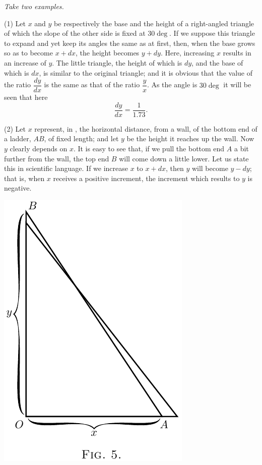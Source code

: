 \documentclass{ximera}
\begin{document}
\textit{Take two examples.}

(1) Let $x$ and $y$ be respectively the base and the
height of a right-angled triangle 
of which the slope of the other side is fixed at $30 \deg$. If we
suppose this triangle to expand and yet keep its
angles the same as at first, then, when the base grows
so as to become $x + dx$, the height becomes $y + dy$.
Here, increasing $x$ results in an increase of $y$. The
little triangle, the height of which is $dy$, and the base
of which is $dx$, is similar to the original triangle; and
it is obvious that the value of the ratio $\dfrac{dy}{dx}$ is the
same as that of the ratio $\dfrac{y}{x}$. As the angle is $30\deg$ it
will be seen that here
$$
\frac{dy}{dx} = \frac{1}{1.73}.
$$

(2) Let $x$ represent, in %
, the horizontal distance,
from a wall, of the bottom end of a ladder, $AB$,
of fixed length; and let $y$ be the height it
reaches up the wall. Now $y$ clearly depends on $x$.
It is easy to see that, if we pull the bottom end $A$ a
bit further from the wall, the top end $B$ will come
down a little lower. Let us state this in scientific
language. If we increase $x$ to $x + dx$, then $y$ will
become $y - dy$; that is, when $x$ receives a positive
increment, the increment which results to $y$ is
negative.

\begin{image}
\includegraphics{fig5.png}
\end{image}
\end{document}
